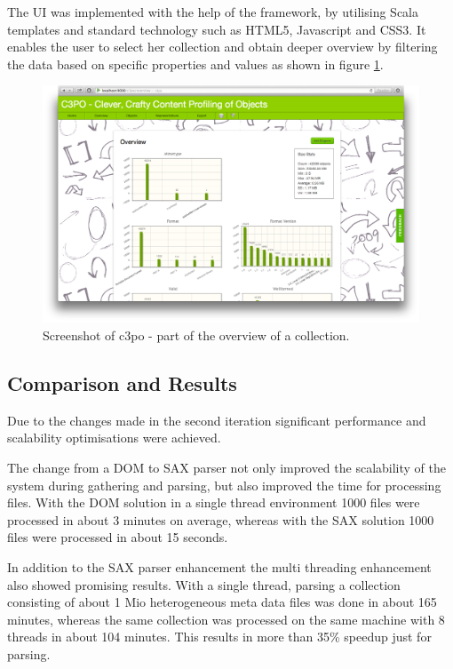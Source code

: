 The UI was implemented with the help of the framework, by utilising Scala templates and standard technology such as HTML5, Javascript and CSS3. It enables the user to select her collection and obtain deeper overview by filtering the data based on specific properties and values as shown in figure \ref{fig:web_app_overview}.

\begin{figure}[htb]
\begin{center}
\includegraphics[width=5.5in]{figures/architecture/web_app_overview}
\caption{Screenshot of c3po - part of the overview of a collection.}
\label{fig:web_app_overview}
\end{center}
\end{figure}

\subsection{Comparison and Results}
Due to the changes made in the second iteration significant performance and scalability optimisations were achieved.

The change from a DOM to SAX parser not only improved the scalability of the system during gathering and parsing, but also improved the time for processing files. With the DOM solution in a single thread environment 1000 files were processed in about 3 minutes on average, whereas with the SAX solution 1000 files were processed in about 15 seconds.

In addition to the SAX parser enhancement the multi threading enhancement also showed promising results. With a single thread, parsing a collection consisting of about 1 Mio heterogeneous meta data files was done in about 165 minutes, whereas the same collection was processed on the same machine with 8 threads in about 104 minutes. This results in more than 35\% speedup just for parsing.

